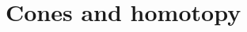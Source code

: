 \documentclass[../../../main]{subfiles}
\begin{document}
\chapter{Cones and homotopy}






\end{document}

